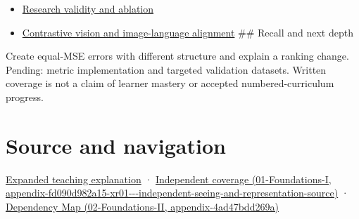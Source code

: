 \begin{itemize}
\item
  \hyperref[appendix-65788587ef78]{Research validity and ablation}
\item
  \hyperref[appendix-772f1fd96148]{Contrastive vision and image-language alignment} \#\# Recall and next depth
\end{itemize}

Create equal-MSE errors with different structure and explain a ranking change. Pending: metric implementation and targeted validation datasets. Written coverage is not a claim of learner mastery or accepted numbered-curriculum progress.

\section{Source and navigation}\label{appendix-b2c1846508bf-source-and-navigation}

\href{Continuous\%20Notes/University\%20-\%20Worlds,\%20Images\%20and\%20Inference\%20-\%20Graphics,\%20Vision\%20and\%20Photography\#Quality\%20numbers\%20need\%20a\%20question\%20they\%20can\%20actually\%20answer}{Expanded teaching explanation} · \href{../01-Foundations-I/main.pdf\#nameddest=appendix-fd090d982a15-xr01---independent-seeing-and-representation-source}{Independent coverage (01-Foundations-I, appendix-fd090d982a15-xr01-\/-\/-independent-seeing-and-representation-source)} · \href{../02-Foundations-II/main.pdf\#nameddest=appendix-4ad47bdd269a}{Dependency Map (02-Foundations-II, appendix-4ad47bdd269a)}
